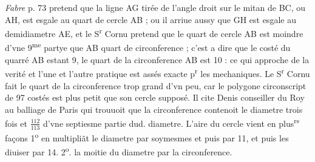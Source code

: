 \documentclass[11pt,a4paper]{article}
\begin{document}

\emph{Fabre} p. 73 pretend que la ligne AG tirée de l'angle droit sur le mitan de BC, ou AH, est esgale au quart de cercle AB ; ou il arriue aussy que GH est esgale au demidiametre AE, et le S\textsuperscript{r} Cornu pretend que le quart de cercle AB est moindre d'vne 9\textsuperscript{me} partye que AB quart de circonference ; c'est a dire que le costé du quarré AB estant 9, le quart de la circonference AB est 10 : ce qui approche de la verité et l'une et l'autre pratique est assés exacte p\textsuperscript{r} les mechaniques. Le S\textsuperscript{r} Cornu fait le quart de la circonference trop grand d'vn peu, car le polygone circonscript de 97 costés est plus petit que son cercle supposé. Il cite Denis \emph{} conseiller du Roy au balliage de Paris qui trouuoit que la circonference contenoit le diametre trois fois et $\frac{112}{113}$ d'vne septiesme partie dud. diametre. L'aire du cercle vient en plus\textsuperscript{rs} façons 1\textsuperscript{o} en multipliãt le diametre par soymesmes et puis par 11, et puis les diuiser par 14. 2\textsuperscript{o}. la moitie du diametre par la circonference.
\end{document}
